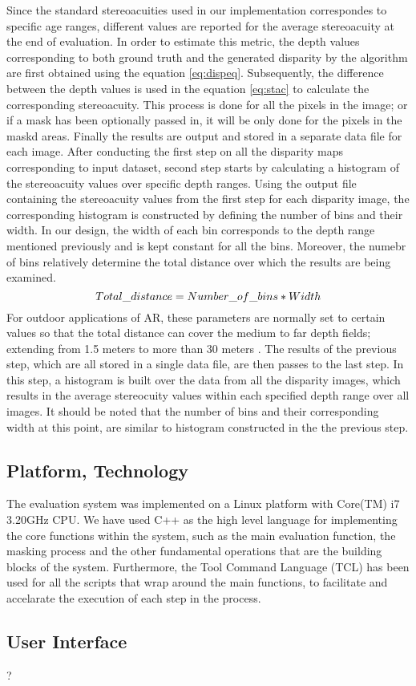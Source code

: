 Since the standard stereoacuities used in our implementation correspondes to specific age ranges, different values are reported for the average stereoacuity
at the end of evaluation. 
In order to estimate this metric, the depth values corresponding to both ground truth and the generated disparity by the algorithm are first
obtained using the equation \ref{eq:dispeq}. Subsequently, the difference between the depth values is used in the equation \ref{eq:stac} to calculate
the corresponding stereoacuity. This process is done for all the pixels in the image; or if a mask has been optionally passed in, 
it will be only done for the pixels in the maskd areas. Finally the results are output and stored in a separate data file for each image.
After conducting the first step on all the disparity maps corresponding to input dataset, second step starts by calculating a histogram of
the stereoacuity values over specific depth ranges. Using the output file containing the stereoacuity values 
from the first step for each disparity image, the corresponding histogram is constructed by defining the number of bins and their width.
In our design, the width of each bin corresponds to the depth range mentioned previously and is kept constant for all the bins.
Moreover, the numebr of bins relatively determine the total distance over which the results
are being examined.
\begin{equation}
\centering
Total\_distance = Number\_of\_bins * Width
\end{equation}
For outdoor applications of AR, these parameters are normally set to certain values so that the total distance can cover the medium to far 
depth fields; extending from 1.5 meters to more than 30 meters \cite{swa07}.
The results of the previous step, which are all stored in a single data file, are then passes to the last step. 
In this step, a histogram is built over the data from all the disparity images, which results in the average stereocuity
values within each specified depth range over all images. 
It should be noted that the number of bins and their corresponding width at this point, are
similar to histogram constructed in the the previous step.

\subsection{Platform, Technology}
The evaluation system was implemented on a Linux platform with Core(TM) i7 3.20GHz CPU. 
We have used C++ as the high level language for implementing 
the core functions within the system, such as the main evaluation function, 
the masking process and the other fundamental operations that are the building blocks of the system.
Furthermore, the Tool Command Language (TCL) has been used for all the scripts that wrap around the main functions,
to facilitate and accelarate the execution of each step in the process.

\subsection{User Interface}
?
